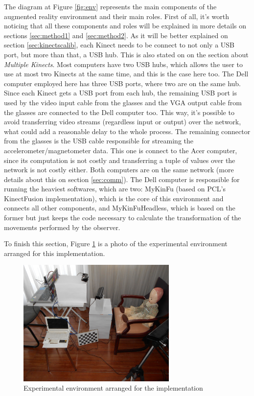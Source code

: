 \documentclass[msc, a4paper, classic, en]{ufbathesis}
\begin{document}
The diagram at Figure \ref{fig:env} represents the main components of the augmented reality environment and their main roles. First of all, it's worth noticing that all these components and roles will be explained in more details on sections \ref{sec:method1} and \ref{sec:method2}. As it will be better explained on section \ref{sec:kinectscalib}, each Kinect needs to be connect to not only a USB port, but more than that, a USB hub. This is also stated on \cite{kinecthacks} on the section about \textit{Multiple Kinects}. Most computers have two USB hubs, which allows the user to use at most two Kinects at the same time, and this is the case here too. The Dell computer employed here has three USB ports, where two are on the same hub. Since each Kinect gets a USB port from each hub, the remaining USB port is used by the video input cable from the glasses and the VGA output cable from the glasses are connected to the Dell computer too. This way, it's possible to avoid transferring video streams (regardless input or output) over the network, what could add a reasonable delay to the whole process. The remaining connector from the glasses is the USB cable responsible for streaming the accelerometer/magnetometer data. This one is connect to the Acer computer, since its computation is not costly and transferring a tuple of values over the network is not costly either. Both computers are on the same network (more details about this on section \ref{sec:comm}). The Dell computer is responsible for running the heaviest softwares, which are two: MyKinFu (based on PCL's KinectFusion implementation), which is the core of this environment and connects all other components, and MyKinFuHeadless, which is based on the former but just keeps the code necessary to calculate the transformation of the movements performed by the observer.

To finish this section, Figure \ref{fig:expenv} is a photo of the experimental environment arranged for this implementation.

\begin{figure}
\centering
\includegraphics[width=0.7\textwidth]{images/expenv.jpg}
\caption{Experimental environment arranged for the implementation}
\label{fig:expenv}
\end{figure}
\end{document}
